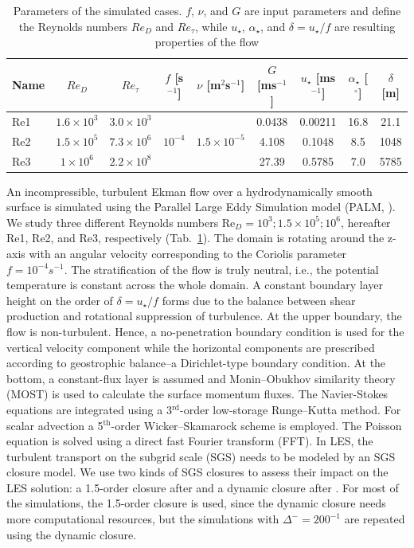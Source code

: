 \documentclass[draft,a4paper,11pt]{article}
\begin{document}
\begin{table}
	\centering
	\caption{Parameters of the simulated cases. $f$, $\nu$, and $G$ are input parameters and define the Reynolds numbers $Re_D$ and $Re_\tau$, while $u_\star$, $\alpha_\star$, and $\delta = u_\star/f$ are resulting properties of the flow}
	\begin{tabular}{lcccccccc}
          \toprule  
	  Name & $Re_D$ & $Re_\tau$ & $f$ [s$^{-1}$] & $\nu$ [m$^2$s$^{-1}$] & $G$ [ms$^{-1}$] & $u_\star$ [ms$^{-1}$] & $\alpha_\star$ [$^\circ$]& $\delta$ [m] \\
          \midrule
	  Re1 & $1.6\times10^3$ & $3.0\times10^3$ &  &  & 0.0438 & 0.00211 & 16.8 & 21.1 \\
	  Re2 & $1.5\times10^5$ & $7.3\times10^6$ & $10^{-4}$ & $1.5\times10^{-5}$ & 4.108 & 0.1048 & 8.5 & 1048\\
	  Re3 & $1\times10^6$ & $2.2\times10^8$ &  &  & 27.39 & 0.5785 & 7.0 & 5785 \\
          \bottomrule
	\end{tabular}
	\label{simulation_parameters}
\end{table}
An incompressible, turbulent Ekman flow over a hydrodynamically smooth surface is simulated using the Parallel Large Eddy Simulation model (PALM, \citealp{maronga2020overview}). We study three different Reynolds numbers Re$_D = 10^3;1.5\times 10^5;10^6$, hereafter Re1, Re2, and Re3, respectively (Tab.~\ref{simulation_parameters}).
%
The domain is rotating around the z-axis with an angular velocity corresponding to the Coriolis parameter $f=10^{-4}s^{-1}$. The stratification of the flow is truly neutral, i.e., the potential temperature is constant across the whole domain. A constant boundary layer height on the order of $\delta=u_\star/f$ forms due to the balance between shear production and rotational suppression of turbulence. At the upper boundary, the flow is non-turbulent. Hence, a no-penetration boundary condition is used for the vertical velocity component while the horizontal components are prescribed according to geostrophic balance--a Dirichlet-type boundary condition. At the bottom, a constant-flux layer is assumed and Monin--Obukhov similarity theory (MOST) is used to calculate the surface momentum fluxes. The Navier-Stokes equations are integrated using a 3$^\text{rd}$-order low-storage Runge--Kutta method. For scalar advection a 5$^\text{th}$-order Wicker--Skamarock scheme is employed. The Poisson equation is solved using a direct fast Fourier transform (FFT). In LES, the turbulent transport on the subgrid scale (SGS) needs to be modeled by an SGS closure model. We use two kinds of SGS closures to assess their impact on the LES solution: a 1.5-order closure after \cite{deardorff1980stratocumulus} and a dynamic closure after \cite{heinz2008realizability}. For most of the simulations, the 1.5-order closure is used, since the dynamic closure needs more computational resources, but the simulations with $\Delta^-=200^{-1}$ are repeated using the dynamic closure.  
\end{document}
